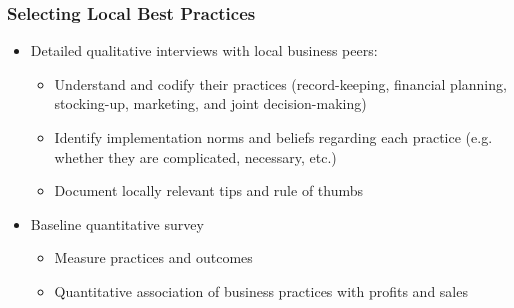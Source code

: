 \documentclass[hideothersubsections, usenames,dvipsnames,10pt]{beamer}
\begin{document}
\begin{frame}
\frametitle{Selecting Local Best Practices}
\begin{itemize}
\item Detailed \textcolor[rgb]{0.00,0.07,1.00}{qualitative interviews} with local business peers:
    \begin{itemize}
    \item Understand and codify their practices (record-keeping, financial planning, stocking-up, marketing, and joint decision-making)
    \item Identify implementation norms and beliefs regarding each practice (e.g. whether they are complicated, necessary, etc.)
    \item Document locally relevant tips and rule of thumbs
    \end{itemize}
\vspace{0.2in}
\item Baseline \textcolor[rgb]{0.00,0.07,1.00}{quantitative survey}
    \begin{itemize}
    \item Measure practices and outcomes
    \item Quantitative association of business practices with profits and sales
    \end{itemize}
\end{itemize}
\end{frame}
\end{document}
